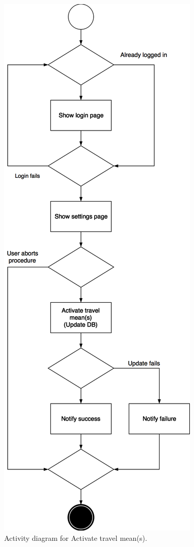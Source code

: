 \documentclass{article}
\begin{document}
	\begin{figure}[h!]
		\bigskip
		\centering
		\includegraphics[scale=0.25]{img/diagrams/activate_travel_mean_ad.png}
		\caption{Activity diagram for Activate travel mean(s).}
	\end{figure}
	\newpage
\end{document}
